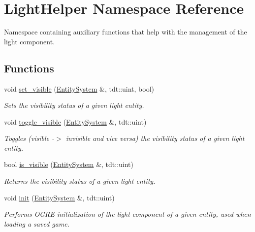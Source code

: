\hypertarget{namespace_light_helper}{}\section{Light\+Helper Namespace Reference}
\label{namespace_light_helper}


Namespace containing auxiliary functions that help with the management of the light component.  


\subsection*{Functions}
\begin{DoxyCompactItemize}
\item 
void \hyperlink{namespace_light_helper_a6c6813cf603e166a7012a8ccbd376d8e}{set\+\_\+visible} (\hyperlink{class_entity_system}{Entity\+System} \&, tdt\+::uint, bool)
\begin{DoxyCompactList}\small\item\em Sets the visibility status of a given light entity. \end{DoxyCompactList}\item 
void \hyperlink{namespace_light_helper_adf1ce2278d082b0d86a2e39790f9482a}{toggle\+\_\+visible} (\hyperlink{class_entity_system}{Entity\+System} \&, tdt\+::uint)
\begin{DoxyCompactList}\small\item\em Toggles (visible -\/$>$ invisible and vice versa) the visibility status of a given light entity. \end{DoxyCompactList}\item 
bool \hyperlink{namespace_light_helper_ae4041a1b25dff6f325c4e9f05ebb5889}{is\+\_\+visible} (\hyperlink{class_entity_system}{Entity\+System} \&, tdt\+::uint)
\begin{DoxyCompactList}\small\item\em Returns the visibility status of a given light entity. \end{DoxyCompactList}\item 
void \hyperlink{namespace_light_helper_aee452182a59b1c0ae9cd1fe660d7d390}{init} (\hyperlink{class_entity_system}{Entity\+System} \&, tdt\+::uint)
\begin{DoxyCompactList}\small\item\em Performs O\+G\+RE initialization of the light component of a given entity, used when loading a saved game. \end{DoxyCompactList}\end{DoxyCompactItemize}


